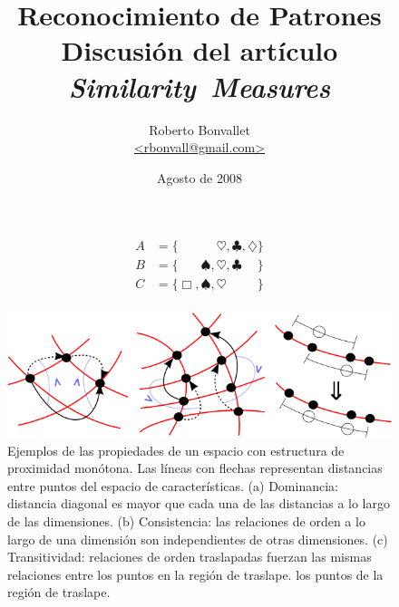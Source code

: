 \documentclass[spanish]{article}
\title{Reconocimiento de Patrones \\
    Discusión del artículo \textit{Similarity~Measures}}
\author{Roberto Bonvallet \\ \url {<rbonvall@gmail.com>}}
\date{Agosto de 2008}
\begin{document}
\maketitle

\newcommand{\SMA}{\Box}
\newcommand{\SMB}{\spadesuit}
\newcommand{\SMC}{\heartsuit}
\newcommand{\SMD}{\clubsuit}
\newcommand{\SME}{\diamondsuit}

\begin{align*}
    A &= \{\phantom{\SMA,  \SMB,} \SMC,          \SMD,          \SME\}  \\
    B &= \{\phantom{\SMA,} \SMB,  \SMC,          \SMD\phantom{, \SME}\} \\
    C &=          \{\SMA,  \SMB,  \SMC\phantom{, \SMD,          \SME}\} \\
\end{align*}

\begin{figure}
 \centering
 \includegraphics[bb=0 0 513 166]{imagenes/dom-cons-trans.png}
 \caption{%
    Ejemplos de las propiedades de un espacio con estructura de proximidad
    monótona. Las líneas con flechas representan distancias entre puntos del
    espacio de características.
    (a) Dominancia: distancia diagonal es mayor que cada una de las distancias
        a lo largo de las dimensiones.
    (b) Consistencia: las relaciones de orden a lo largo de una dimensión son
        independientes de otras dimensiones.
    (c) Transitividad: relaciones de orden traslapadas fuerzan las mismas
        relaciones entre los puntos en la región de traslape.
        los puntos de la región de traslape.
 }
 \label{fig:cons-dom-trans}
\end{figure}
\end{document}

